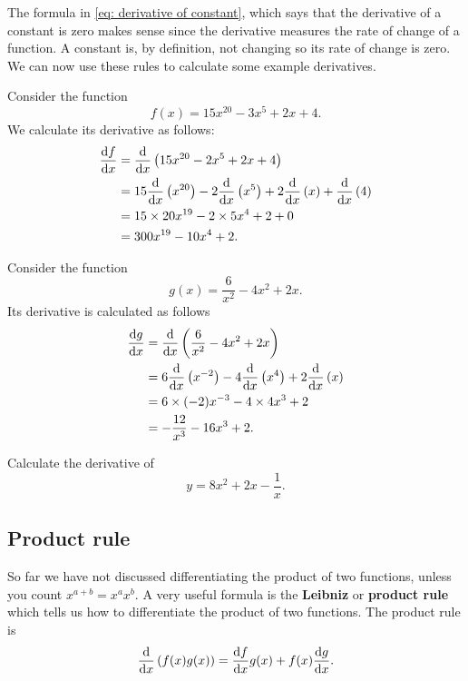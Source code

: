 The formula in \cref{eq: derivative of constant}, which says that the derivative of a constant is zero makes sense since the derivative measures the rate of change of a function. A constant is, by definition, not changing so its rate of change is zero.\\

We can now use these rules to calculate some example derivatives.
\begin{ex}
Consider the function 
\begin{equation*}
f(x)=15x^{20}-3x^{5}+2x+4.
\end{equation*}
We calculate its derivative as follows:
\begin{align*}
\frac{\mathrm{d} f}{\mathrm{d} x}	&=\frac{\mathrm{d}}{\mathrm{d} x}\left(15x^{20}-2x^{5}+2x+4\right)\\
			&=15\frac{\mathrm{d}}{\mathrm{d} x}\left(x^{20}\right)-2\frac{\mathrm{d}}{\mathrm{d} x}\left(x^{5}\right)+2\frac{\mathrm{d}}{\mathrm{d} x}\left(x\right)+\frac{\mathrm{d}}{\mathrm{d} x}\left(4\right)\\
			&=15 \times 20 x^{19}-2\times 5 x^{4}+2 +0\\
			&=300 x^{19}-10x^{4}+2.
\end{align*}
\end{ex}

\begin{ex}
Consider the function 
\begin{equation*}
g(x)=\frac{6}{x^{2}}-4x^{2}+2x.
\end{equation*}
Its derivative is calculated as follows 
\begin{align*}
\frac{\mathrm{d} g}{\mathrm{d} x}	&=\frac{\mathrm{d}}{\mathrm{d} x}\left(\frac{6}{x^{2}}-4x^{2}+2x\right)\\
			&=6\frac{\mathrm{d}}{\mathrm{d} x}\left(x^{-2}\right)-4\frac{\mathrm{d}}{\mathrm{d} x}\left(x^{4}\right)+2\frac{\mathrm{d} }{\mathrm{d} x}\left(x\right)\\
			&=6\times (-2) x^{-3}-4\times 4 x^{3}+2\\
			&=-\frac{12}{x^{3}}-16x^{3}+2.
\end{align*}
\end{ex}

\begin{exercise}
Calculate the derivative of 
\begin{equation*}
y=8x^{2}+2x-\frac{1}{x}.
\end{equation*}
\end{exercise}

\subsection*{Product rule}
So far we have not discussed differentiating the product of two functions, unless you count $x^{a+b}=x^{a}x^{b}$. A very useful formula is the \textbf{Leibniz} or \textbf{product rule} which tells us how to differentiate the product of two functions. The product rule is
\begin{equation}
\frac{\mathrm{d} }{\mathrm{d} x}\left(f(x)g(x)\right)=\frac{\mathrm{d} f}{\mathrm{d} x}g(x)+f(x)\frac{\mathrm{d} g}{\mathrm{d} x}. \label{eq: product rule}
\end{equation}

